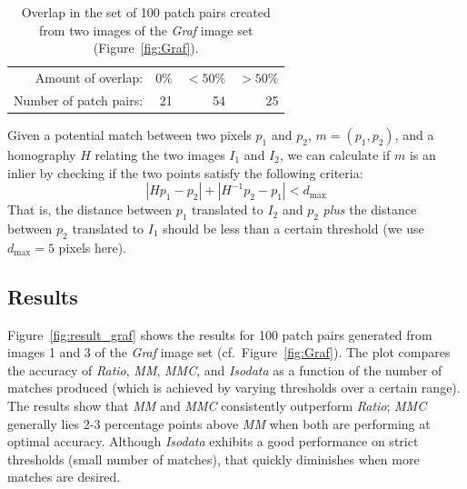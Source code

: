 \documentclass{article}
\begin{document}
\begin{table}[htb]
\caption{Overlap in the set of 100 patch pairs created from two images of the \emph{Graf} image set (Figure~\ref{fig:Graf}).}
\label{table:overlap}
	\centering
\begin{tabular}{r*{3}{r}}
\hline
	Amount of overlap: & 0\% & $< 50$\% & $> 50$\%  \\
	\noalign{\smallskip}
	Number of patch pairs: & 21 & 54 & 25 \\
	\hline
\end{tabular}
\end{table}


Given a potential match between two pixels $p_1$ and 
$p_2$, $m = \left(p_1, p_2\right)$, and a homography $H$ relating the two images $I_1$ and $I_2$, we 
can calculate if $m$ is an inlier by checking if the two points satisfy the following criteria:
\begin{equation*}
\left\vert H p_1 - p_2 \right\vert + \left\vert H^{-1}p_2 - p_1 \right\vert < d_{\max}
\end{equation*}
That is, the distance between $p_1$ translated to $I_2$ and $p_2$ 
\emph{plus} the distance between $p_2$ translated to $I_1$ should be 
less than a certain threshold (we use $d_{\max}=5$ pixels here).


\subsection{Results}
\label{S:Results}

Figure~\ref{fig:result_graf} shows the results for 100 patch pairs 
generated from images 1 and 3 of the \emph{Graf} image set (cf.~Figure~\ref{fig:Graf}). The plot 
compares the accuracy of \emph{Ratio}, \emph{MM}, \emph{MMC}, and 
\emph{Isodata} as a function of the number of matches produced (which is achieved by varying thresholds over a certain range). The results show that \emph{MM} and \emph{MMC} consistently outperform \emph{Ratio}; \emph{MMC} generally lies 2-3 percentage points above \emph{MM} when both are performing at optimal accuracy. 
Although \emph{Isodata} exhibits a good performance on strict thresholds (small number of matches), that quickly diminishes when more matches are desired.
\end{document}
